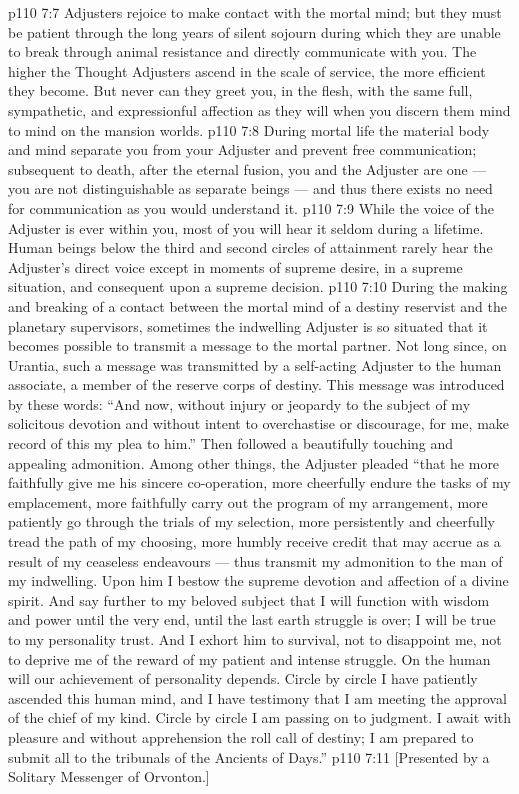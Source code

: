 \vs p110 7:7 Adjusters rejoice to make contact with the mortal mind; but they must be patient through the long years of silent sojourn during which they are unable to break through animal resistance and directly communicate with you. The higher the Thought Adjusters ascend in the scale of service, the more efficient they become. But never can they greet you, in the flesh, with the same full, sympathetic, and expressionful affection as they will when you discern them mind to mind on the mansion worlds.
\vs p110 7:8 During mortal life the material body and mind separate you from your Adjuster and prevent free communication; subsequent to death, after the eternal fusion, you and the Adjuster are one --- you are not distinguishable as separate beings --- and thus there exists no need for communication as you would understand it.
\vs p110 7:9 While the voice of the Adjuster is ever within you, most of you will hear it seldom during a lifetime. Human beings below the third and second circles of attainment rarely hear the Adjuster’s direct voice except in moments of supreme desire, in a supreme situation, and consequent upon a supreme decision.
\vs p110 7:10 \pc During the making and breaking of a contact between the mortal mind of a destiny reservist and the planetary supervisors, sometimes the indwelling Adjuster is so situated that it becomes possible to transmit a message to the mortal partner. Not long since, on Urantia, such a message was transmitted by a self\hyp{}acting Adjuster to the human associate, a member of the reserve corps of destiny. This message was introduced by these words: “And now, without injury or jeopardy to the subject of my solicitous devotion and without intent to overchastise or discourage, for me, make record of this my plea to him.” Then followed a beautifully touching and appealing admonition. Among other things, the Adjuster pleaded “that he more faithfully give me his sincere co\hyp{}operation, more cheerfully endure the tasks of my emplacement, more faithfully carry out the program of my arrangement, more patiently go through the trials of my selection, more persistently and cheerfully tread the path of my choosing, more humbly receive credit that may accrue as a result of my ceaseless endeavours --- thus transmit my admonition to the man of my indwelling. Upon him I bestow the supreme devotion and affection of a divine spirit. And say further to my beloved subject that I will function with wisdom and power until the very end, until the last earth struggle is over; I will be true to my personality trust. And I exhort him to survival, not to disappoint me, not to deprive me of the reward of my patient and intense struggle. On the human will our achievement of personality depends. Circle by circle I have patiently ascended this human mind, and I have testimony that I am meeting the approval of the chief of my kind. Circle by circle I am passing on to judgment. I await with pleasure and without apprehension the roll call of destiny; I am prepared to submit all to the tribunals of the Ancients of Days.”
\vsetoff
\vs p110 7:11 [Presented by a Solitary Messenger of Orvonton.]
\quizlink
